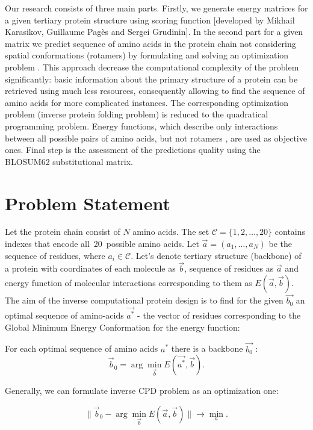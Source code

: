 \documentclass[12pt,twoside]{article}
\begin{document}
Our research consists of three main parts. 
Firstly, we generate energy matrices for a given tertiary protein structure using scoring function [developed by Mikhail Karasikov, Guillaume Pagès and Sergei Grudinin].
In the second part for a given matrix we predict sequence of amino acids in the protein chain not considering spatial conformations (rotamers) by formulating and solving an optimization problem \cite{Riazanov:2016}.
This approach decrease the computational complexity
of the problem significantly: basic information about the primary structure of a protein can be retrieved using much less resources, consequently allowing to find the sequence of amino acids for more complicated instances.
The corresponding optimization problem (inverse protein folding problem) is reduced to the quadratical programming problem. Energy functions, which describe only interactions between all possible pairs of amino acids, but not rotamers \cite{Rajgaria:2006}, are used as objective ones.
Final step is the assessment of the predictions quality using the BLOSUM62 \cite{Henikoff92} substitutional matrix.
\section{Problem Statement}
Let the protein chain consist of $N$ amino acids. The set $\mathcal{C} = \{1, 2, \dots, 20\}$ contains indexes that encode all~20~possible amino acids. Let $\vec{a} = (a_1,\ldots,a_N)$ be the sequence of residues, where $a_i \in \mathcal{C}$.
Let's denote tertiary structure (backbone) of a protein with coordinates of each molecule as $\vec{b}$, sequence of residues as $\vec{a}$ and energy function of molecular interactions corresponding to them as $E(\vec{a},\vec{b})$. 
The aim of the inverse computational protein design is to find for the given $\vec{b_0}$ an optimal sequence of amino-acids $\vec{a^*}$ - the vector of residues corresponding to the Global Minimum Energy Conformation for the energy function:

For each optimal sequence of amino acids $a^*$ there is a backbone $\vec{b_0}$ : 
\begin{equation} 
\vec{b}_0 = \arg\min_{\vec{b}} E(\vec{a^*},\vec{b}).
\end{equation}

Generally, we can formulate inverse CPD problem as an optimization one:

\begin{equation}
\|\vec{b}_0 - \arg\min_{\vec{b}} E(\vec{a},\vec{b})\|\to \min_{a}.
\end{equation}
\end{document}

